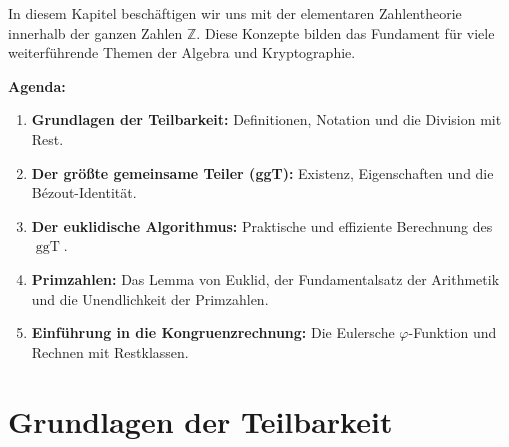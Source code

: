 


\begin{nice-box}
In diesem Kapitel beschäftigen wir uns mit der elementaren Zahlentheorie innerhalb der ganzen Zahlen $\mathbb{Z}$. Diese Konzepte bilden das Fundament für viele weiterführende Themen der Algebra und Kryptographie.

\textbf{Agenda:}
\begin{enumerate}[label=\textbf{\arabic*.}]
    \item \textbf{Grundlagen der Teilbarkeit:} Definitionen, Notation und die Division mit Rest.
    \item \textbf{Der größte gemeinsame Teiler (ggT):} Existenz, Eigenschaften und die Bézout-Identität.
    \item \textbf{Der euklidische Algorithmus:} Praktische und effiziente Berechnung des $\operatorname{ggT}$.
    \item \textbf{Primzahlen:} Das Lemma von Euklid, der Fundamentalsatz der Arithmetik und die Unendlichkeit der Primzahlen.
    \item \textbf{Einführung in die Kongruenzrechnung:} Die Eulersche $\varphi$-Funktion und Rechnen mit Restklassen.
\end{enumerate}
\end{nice-box}

\section{Grundlagen der Teilbarkeit}

